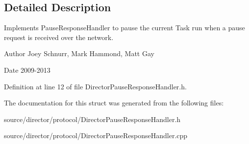 \subsection{Detailed Description}
Implements Pause\-Response\-Handler to pause the current Task run when a pause request is received over the network. 

\begin{DoxyAuthor}{Author}
Joey Schnurr, Mark Hammond, Matt Gay 
\end{DoxyAuthor}
\begin{DoxyDate}{Date}
2009-\/2013 
\end{DoxyDate}


Definition at line 12 of file Director\-Pause\-Response\-Handler.\-h.



The documentation for this struct was generated from the following files\-:\begin{DoxyCompactItemize}
\item 
source/director/protocol/Director\-Pause\-Response\-Handler.\-h\item 
source/director/protocol/Director\-Pause\-Response\-Handler.\-cpp\end{DoxyCompactItemize}
